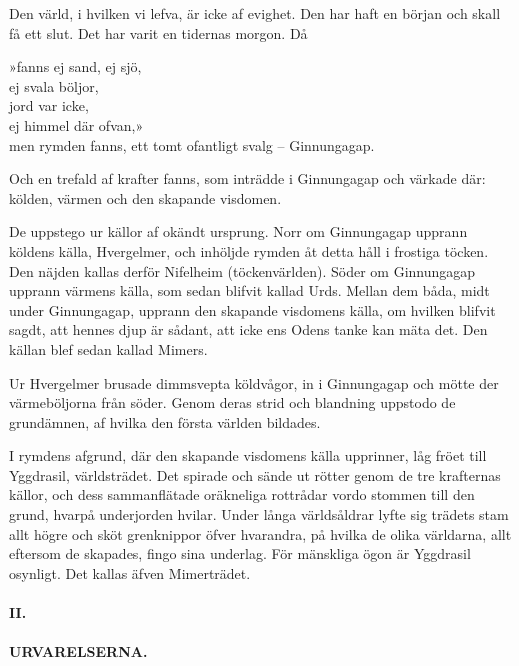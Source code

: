 Den värld, i hvilken vi lefva, är icke af evighet. Den har haft en
början och skall få ett slut. Det har varit en tidernas morgon. Då

{»fanns ej sand, ej sjö,}\\
{ej svala böljor,}\\
{jord var icke,}\\
{ej himmel där ofvan,»}\\

men rymden fanns, ett tomt ofantligt svalg -- Ginnungagap.

Och en trefald af krafter fanns, som inträdde i Ginnungagap och värkade
där: kölden, värmen och den skapande visdomen.

De uppstego ur källor af okändt ursprung. Norr om Ginnungagap upprann
köldens källa, Hvergelmer, och inhöljde rymden åt detta håll i frostiga
töcken. Den näjden kallas derför Nifelheim (töckenvärlden). Söder om
Ginnungagap upprann värmens källa, som sedan blifvit kallad Urds. Mellan
dem båda, midt under Ginnungagap, upprann den skapande visdomens källa,
om hvilken blifvit sagdt, att hennes djup är sådant, att icke ens Odens
tanke kan mäta det. Den källan blef sedan kallad Mimers.

Ur Hvergelmer brusade dimmsvepta köldvågor, in i Ginnungagap och mötte
der värmeböljorna från söder. Genom deras strid och blandning uppstodo
de grundämnen, af hvilka den första världen bildades.

\protect\hypertarget{lb1625905.xhtmlux5cux23start4}{}{}\protect\hypertarget{lb1625905.xhtmlux5cux23start4-a}{}{}\protect\hypertarget{lb1625905.xhtmlux5cux23start4-b}{}{}\protect\hypertarget{lb1625905.xhtmlux5cux23start4-c}{}{}\protect\hypertarget{lb1625905.xhtmlux5cux23start4-d}{}{}

I rymdens afgrund, där den skapande visdomens källa upprinner, låg fröet
till Yggdrasil, världsträdet. Det spirade och sände ut rötter genom de
tre krafternas källor, och dess sammanflätade oräkneliga rottrådar vordo
stommen till den grund, hvarpå underjorden hvilar. Under långa
världsåldrar lyfte sig trädets stam allt högre och sköt grenknippor
öfver hvarandra, på hvilka de olika världarna, allt eftersom de
skapades, fingo sina underlag. För mänskliga ögon är Yggdrasil osynligt.
Det kallas äfven Mimerträdet.

\paragraph{II.}

\paragraph{URVARELSERNA.}

